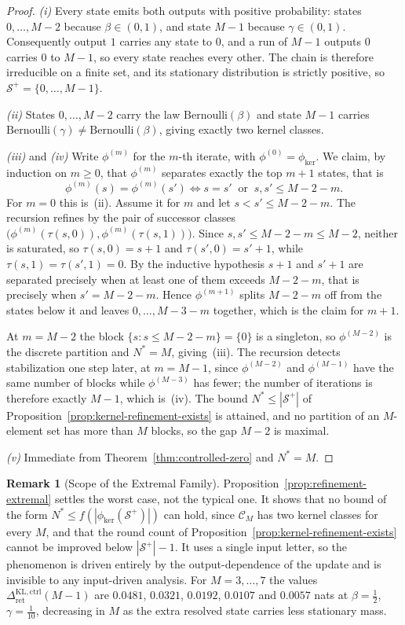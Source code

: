 \documentclass[12pt]{article}
\theoremstyle{definition}
\newtheorem{remark}[theorem]{Remark}
\newcommand{\Splus}{\mathcal S^{+}}
\newcommand{\RetKLc}{\Delta_{\mathrm{ret}}^{\mathrm{KL,ctrl}}}
\begin{document}
\begin{proof}
\emph{(i)} Every state emits both outputs with positive probability: states
$0,\dots,M-2$ because $\beta\in(0,1)$, and state $M-1$ because
$\gamma\in(0,1)$.  Consequently output $1$ carries any state to $0$, and a run
of $M-1$ outputs $0$ carries $0$ to $M-1$, so every state reaches every other.
The chain is therefore irreducible on a finite set, and its stationary
distribution is strictly positive, so $\Splus=\{0,\dots,M-1\}$.

\emph{(ii)} States $0,\dots,M-2$ carry the law $\mathrm{Bernoulli}(\beta)$ and
state $M-1$ carries $\mathrm{Bernoulli}(\gamma)\neq\mathrm{Bernoulli}(\beta)$,
giving exactly two kernel classes.

\emph{(iii)} and \emph{(iv)} Write $\phi^{(m)}$ for the $m$-th iterate, with
$\phi^{(0)}=\phi_{\ker}$. We claim, by induction on $m\ge0$, that $\phi^{(m)}$
separates exactly the top $m+1$ states, that is
\[
\phi^{(m)}(s)=\phi^{(m)}(s')
\iff
s=s'
\ \text{ or }\
s,s'\le M-2-m .
\]
For $m=0$ this is~(ii). Assume it for $m$ and let $s<s'\le M-2-m$. The
recursion refines by the pair of successor classes
$\bigl(\phi^{(m)}(\tau(s,0)),\phi^{(m)}(\tau(s,1))\bigr)$. Since
$s,s'\le M-2-m\le M-2$, neither is saturated, so $\tau(s,0)=s+1$ and
$\tau(s',0)=s'+1$, while $\tau(s,1)=\tau(s',1)=0$. By the inductive hypothesis
$s+1$ and $s'+1$ are separated precisely when at least one of them exceeds
$M-2-m$, that is precisely when $s'=M-2-m$. Hence $\phi^{(m+1)}$ splits
$M-2-m$ off from the states below it and leaves $0,\dots,M-3-m$ together,
which is the claim for $m+1$.

At $m=M-2$ the block $\{s:s\le M-2-m\}=\{0\}$ is a singleton, so
$\phi^{(M-2)}$ is the discrete partition and $N^{\ast}=M$, giving~(iii). The
recursion detects stabilization one step later, at $m=M-1$, since
$\phi^{(M-2)}$ and $\phi^{(M-1)}$ have the same number of blocks while
$\phi^{(M-3)}$ has fewer; the number of iterations is therefore exactly $M-1$,
which is~(iv). The bound $N^{\ast}\le|\Splus|$ of
Proposition~\ref{prop:kernel-refinement-exists} is attained, and no partition
of an $M$-element set has more than $M$ blocks, so the gap $M-2$ is maximal.

\emph{(v)} Immediate from Theorem~\ref{thm:controlled-zero} and $N^{\ast}=M$.
\end{proof}

\begin{remark}[Scope of the Extremal Family]
\label{rem:refinement-extremal-scope}
Proposition~\ref{prop:refinement-extremal} settles the worst case, not the
typical one. It shows that no bound of the form
$N^{\ast}\le f(|\phi_{\ker}(\Splus)|)$ can hold, since $\mathcal C_M$ has two
kernel classes for every $M$, and that the round count of
Proposition~\ref{prop:kernel-refinement-exists} cannot be improved below
$|\Splus|-1$. It uses a single input letter, so the phenomenon is driven
entirely by the output-dependence of the update and is invisible to any
input-driven analysis. For $M=3,\dots,7$ the values $\RetKLc(M-1)$ are
$0.0481$, $0.0321$, $0.0192$, $0.0107$ and $0.0057$ nats at
$\beta=\tfrac12$, $\gamma=\tfrac1{10}$, decreasing in $M$ as the extra
resolved state carries less stationary mass.
\end{remark}
\end{document}
